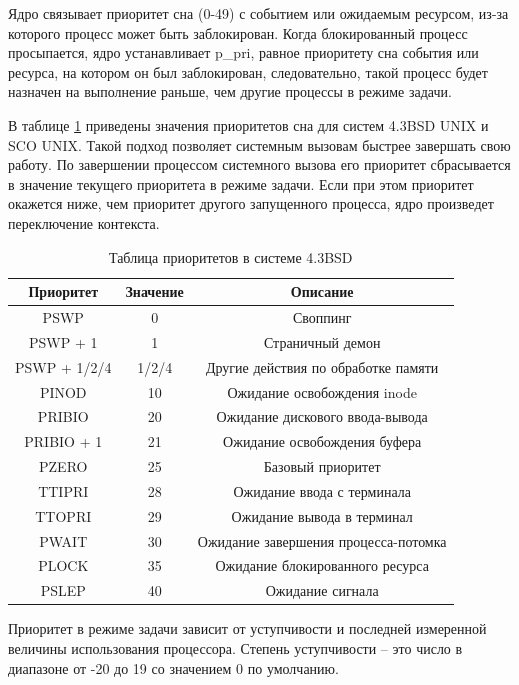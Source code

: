 Ядро связывает приоритет сна (0-49) с событием или ожидаемым ресурсом, из-за которого процесс может быть заблокирован. Когда блокированный процесс просыпается, ядро устанавливает p\_pri, равное приоритету сна события или ресурса, на котором он был заблокирован, следовательно, такой процесс будет назначен на выполнение раньше, чем другие процессы в режиме задачи.

В таблице \ref{table:1} приведены значения приоритетов сна для систем 4.3BSD UNIX и SCO UNIX. Такой подход позволяет системным вызовам быстрее завершать свою работу. По завершении процессом системного вызова его приоритет сбрасывается в значение текущего приоритета в режиме задачи. Если при этом приоритет окажется ниже, чем приоритет другого запущенного процесса, ядро произведет переключение контекста.

\begin{table}
	\begin{center}
		\caption{Таблица приоритетов в системе 4.3BSD}
		\begin{tabular}{|c|c|c|}
			\hline
			\textbf{Приоритет} & \textbf{Значение} & \textbf{Описание} \\
			\hline
			PSWP & 0 & Своппинг \\
			PSWP + 1 & 1 & Страничный демон \\
			PSWP + 1/2/4 & 1/2/4 & Другие действия по обработке памяти \\
			\hline
			PINOD & 10 & Ожидание освобождения inode \\
			PRIBIO & 20 & Ожидание дискового ввода-вывода \\
			PRIBIO + 1 & 21 & Ожидание освобождения буфера \\
			\hline
			PZERO & 25 & Базовый приоритет \\
			TTIPRI & 28 & Ожидание ввода с терминала \\
			TTOPRI & 29 & Ожидание вывода в терминал \\
			\hline
			PWAIT & 30 & Ожидание завершения процесса-потомка \\
			PLOCK & 35 & Ожидание блокированного ресурса \\
			PSLEP & 40 & Ожидание сигнала \\
			\hline
		\end{tabular}
		\label{table:1}
	\end{center}
\end{table}

\clearpage

Приоритет в режиме задачи зависит от уступчивости и последней измеренной величины использования процессора. Степень уступчивости – это число в диапазоне от -20 до 19 со значением 0 по умолчанию.

